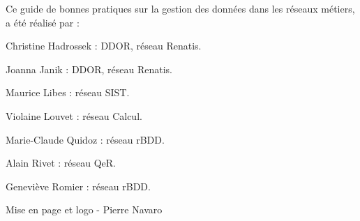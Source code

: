 \vspace*{\fill}
\begingroup

Ce guide de bonnes pratiques sur la gestion des données dans les réseaux métiers, a été réalisé par  :
\begin{list}{-}{}
\item Christine Hadrossek : DDOR, réseau Renatis.
\item Joanna Janik : DDOR, réseau Renatis.
\item Maurice Libes : réseau SIST.
\item Violaine Louvet : réseau Calcul.
\item Marie-Claude Quidoz : réseau rBDD.
\item Alain Rivet : réseau QeR.
\item Geneviève Romier : réseau rBDD.
\end{list}

Mise en page et logo - Pierre Navaro

\endgroup

\vspace*{\fill}
\clearpage
